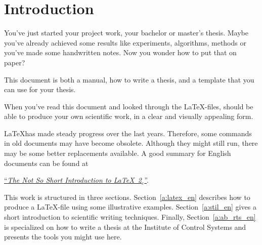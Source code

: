 \section*{Introduction}

You've just started your project work, your bachelor or master's thesis. 
Maybe you've already achieved some results like experiments, algorithms, methods 
or you've made some handwritten notes. Now you wonder how to put that on paper?

This document is both a manual, how to write a thesis, and a template that you can use for your thesis.

When you've read this document and looked through the \LaTeX-files, should be able to produce your
 own scientific work, in a clear and visually appealing form.

\LaTeX has made steady progress over the last years. Therefore, some commands in old documents may have become
obsolete. Although they might still run, there may be some better replacements available. A good summary for English documents 
can be found at

\href{https://www.cs.duke.edu/courses/fall03/cps260/notes/lshort.pdf}{``\textit{The Not So Short Introduction to \LaTeX\ 2${}_\varepsilon$}''}.

This work is structured in three sections. Section~\ref{a:latex_en} describes how to produce a \LaTeX-file using some illustrative examples. 
Section~\ref{a:stil_en} gives a short introduction to scientific writing techniques. Finally, Section~\ref{a:ab_rts_en} is specialized on how 
to write a thesis at the Institute of Control Systems and presents the tools you might use here.
